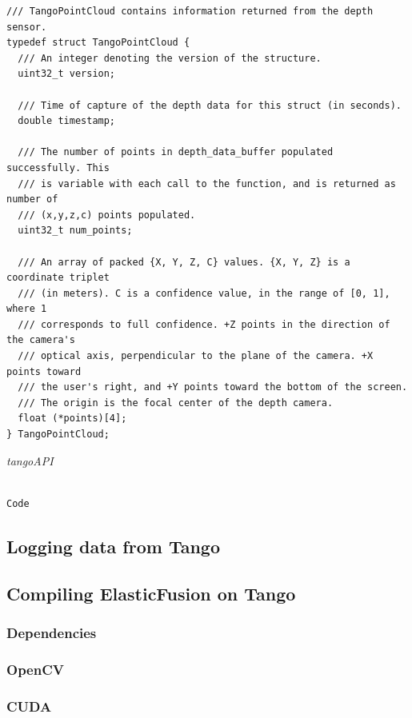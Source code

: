 \documentclass[12pt,twoside]{article}
\begin{document}
\begin{lstlisting}
/// TangoPointCloud contains information returned from the depth sensor.
typedef struct TangoPointCloud {
  /// An integer denoting the version of the structure.
  uint32_t version;

  /// Time of capture of the depth data for this struct (in seconds).
  double timestamp;

  /// The number of points in depth_data_buffer populated successfully. This
  /// is variable with each call to the function, and is returned as number of
  /// (x,y,z,c) points populated.
  uint32_t num_points;

  /// An array of packed {X, Y, Z, C} values. {X, Y, Z} is a coordinate triplet
  /// (in meters). C is a confidence value, in the range of [0, 1], where 1
  /// corresponds to full confidence. +Z points in the direction of the camera's
  /// optical axis, perpendicular to the plane of the camera. +X points toward
  /// the user's right, and +Y points toward the bottom of the screen.
  /// The origin is the focal center of the depth camera.
  float (*points)[4];
} TangoPointCloud;
\end{lstlisting}


\textit{tangoAPI}\\
\\
\begin{lstlisting}
Code
\end{lstlisting}


\newpage

\subsection{Logging data from Tango}





\subsection{Compiling ElasticFusion on Tango}


\subsubsection{Dependencies}


\subsubsection{OpenCV}

\subsubsection{CUDA}
\end{document}
